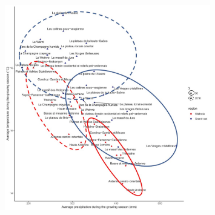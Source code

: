 \documentclass[3p,procedia]{elsarticle}
\begin{document}
\begin{figure}
	\centering
	\includegraphics[width= 0.8\textwidth]{clim_region_nat_GE_Wal_en.jpg}
	\caption{	}
	
	\label{fig:clim}
\end{figure}




	
\end{document}
